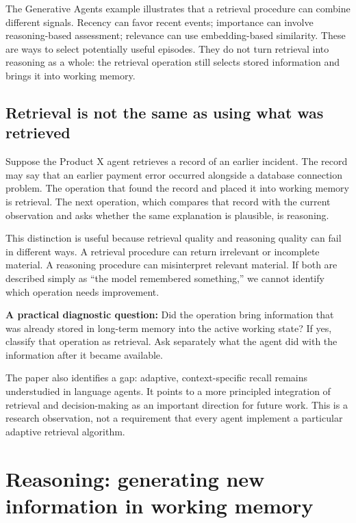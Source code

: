 The Generative Agents example illustrates that a retrieval procedure can combine different signals. Recency can favor recent events; importance can involve reasoning-based assessment; relevance can use embedding-based similarity. These are ways to select potentially useful episodes. They do not turn retrieval into reasoning as a whole: the retrieval operation still selects stored information and brings it into working memory.

\subsection{Retrieval is not the same as using what was retrieved}

Suppose the Product X agent retrieves a record of an earlier incident. The record may say that an earlier payment error occurred alongside a database connection problem. The operation that found the record and placed it into working memory is retrieval. The next operation, which compares that record with the current observation and asks whether the same explanation is plausible, is reasoning.

This distinction is useful because retrieval quality and reasoning quality can fail in different ways. A retrieval procedure can return irrelevant or incomplete material. A reasoning procedure can misinterpret relevant material. If both are described simply as ``the model remembered something,'' we cannot identify which operation needs improvement.

\begin{tipbox}
\textbf{A practical diagnostic question:} Did the operation bring information that was already stored in long-term memory into the active working state? If yes, classify that operation as retrieval. Ask separately what the agent did with the information after it became available.
\end{tipbox}

The paper also identifies a gap: adaptive, context-specific recall remains understudied in language agents. It points to a more principled integration of retrieval and decision-making as an important direction for future work. This is a research observation, not a requirement that every agent implement a particular adaptive retrieval algorithm.

\section{Reasoning: generating new information in working memory}
\label{sec:reasoning}

